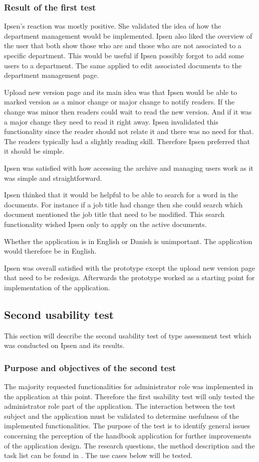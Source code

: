 \subsubsection*{Result of the first test}
Ipsen's reaction was mostly positive.
She validated the idea of how the department management would be implemented.
Ipsen also liked the overview of the user that both show those who are and those who are not associated to a specific department.
This would be useful if Ipsen possibly forgot to add some users to a department.
The same applied to edit associated documents to the department management page.

Upload new version page and its main idea was that Ipsen would be able to marked version as a minor change or major change to notify readers.
If the change was minor then readers could wait to read the new version.
And if it was a major change they need to read it right away.
Ipsen invalidated this functionality since the reader should not relate it and there was no need for that.
The readers typically had a slightly reading skill.
Therefore Ipsen preferred that it should be simple.

Ipsen was satisfied with how accessing the archive and managing users work as it was simple and straightforward.

Ipsen thinked that it would be helpful to be able to search for a word in the documents.
For instance if a job title had change then she could search which document mentioned the job title that need to be modified.
This search functionality wished Ipsen only to apply on the active documents.

Whether the application is in English or Danish is unimportant.
The application would therefore be in English.

Ipsen was overall satisfied with the prototype except the upload new version page that need to be redesign.
Afterwards the prototype worked as a starting point for implementation of the application.

\subsection{Second usability test}\label{secondtest}
This section will describe the second usability test	of type assessment test which was conducted on Ipsen and its results.

\subsubsection*{Purpose and objectives of the second test}
The majority requested functionalities for administrator role was implemented in the application at this point.
Therefore the first usability test will only tested the administrator role part of the application.
The interaction between the test subject and the application must be validated to determine usefulness of the implemented functionalities.
The purpose of the test is to identify general issues concerning the perception of the handbook application for further improvements of the application design.
The research questions, the method description and the task list can be found in .
The use cases below will be tested.


